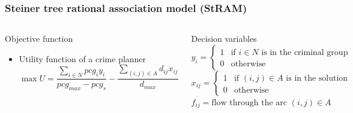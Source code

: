 \documentclass[aspectratio=169]{beamer}
\begin{document}
\begin{frame}
\frametitle{Steiner tree rational association model (StRAM)}
\begin{columns}
  \begin{block}{Objective function}
    \begin{itemize}
    \footnotesize
      \item Utility function of a crime planner
      \begin{equation*}
        \max U = \frac{\sum_{i \in N} pcg_i y_i}{pcg_{max} - pcg_s} - \frac{\sum_{(i,j) \in A} d_{ij} x_{ij}}{d_{max}}
      \end{equation*}
    \end{itemize}
  \end{block}
    \begin{block}{Decision variables}
    \footnotesize
      \vspace{1em}
      $y_{i} =
        \begin{cases}
          1 & \text{if $i \in N$ is in the criminal group}\\
          0 & \text{otherwise}
        \end{cases}$\\
      $x_{ij} =
        \begin{cases}
          1 & \text{if $(i,j) \in A$ is in the solution}\\
          0 & \text{otherwise}
        \end{cases}$\\
      $f_{ij} = \text{flow through the arc $(i,j) \in A$}$
    \end{block}
  \end{columns}
\end{frame}
\end{document}
